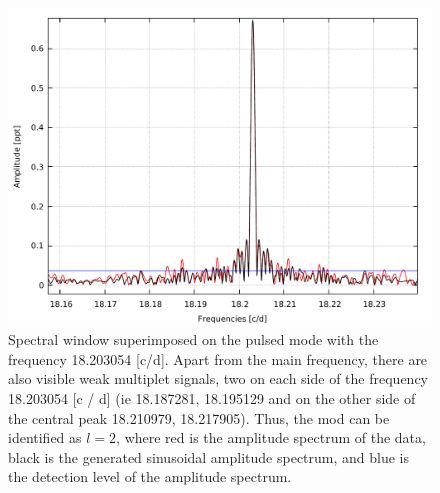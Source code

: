 \documentclass{aa}
\begin{document}
\begin{figure}[h]
    \centering
    \includegraphics[scale=0.6]{images/okno_spektralne.pdf}
    \caption{Spectral window superimposed on the pulsed mode with the frequency 18.203054 [c/d]. Apart from the main frequency, there are also visible weak multiplet signals, two on each side of the frequency 18.203054 [c / d] (ie 18.187281, 18.195129 and on the other side of the central peak 18.210979, 18.217905). Thus, the mod can be identified as $ l = 2 $, where red is the amplitude spectrum of the data, black is the generated sinusoidal amplitude spectrum, and blue is the detection level of the amplitude spectrum.}
    \label{fig:my_label_2}
\end{figure}
\end{document}
